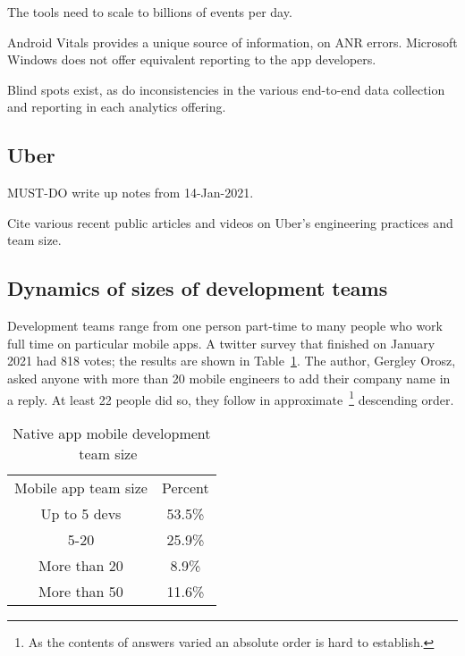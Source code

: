 The tools need to scale to billions of events per day.

Android Vitals provides a unique source of information, on ANR errors. Microsoft Windows does not offer equivalent reporting to the app developers. %

Blind spots exist, as do inconsistencies in the various end-to-end data collection and reporting in each analytics offering. 



\subsection{Uber}
MUST-DO write up notes from 14-Jan-2021.

Cite various recent public articles and videos on Uber's engineering practices and team size.


\subsection{Dynamics of sizes of development teams}
Development teams range from one person part-time to many people who work full time on particular mobile apps. A twitter survey that finished on  January 2021 had 818 votes; the results are shown in Table~\ref{tab:gergelyorosz_twitter_team_size_survey_02_jan_2021}. %
The author, Gergley Orosz, asked anyone with more than 20 mobile engineers to add their company name in a reply. At least 22 people did so, they follow in approximate~\footnote{As the contents of answers varied an absolute order is hard to establish.} descending order.

\begin{table}[htbp!]
    \centering
    \begin{tabular}{c|c}
        Mobile app team size &Percent  \\
        Up to 5 devs &53.5\% \\
        5-20         &25.9\% \\
        More than 20 &8.9\% \\
        More than 50 &11.6\% \\
    \end{tabular}
    \caption{Native app mobile development team size~\citep{gergelyorosz2021_twitter_mobile_app_poll}}
    \label{tab:gergelyorosz_twitter_team_size_survey_02_jan_2021}
\end{table}

